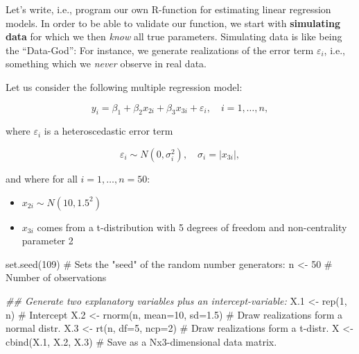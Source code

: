 \documentclass[
  letterpaper,
  DIV=11,
  numbers=noendperiod]{scrreprt}
\newenvironment{Shaded}{\begin{snugshade}}{\end{snugshade}}
\newcommand{\AttributeTok}[1]{\textcolor[rgb]{0.40,0.45,0.13}{#1}}
\newcommand{\CommentTok}[1]{\textcolor[rgb]{0.37,0.37,0.37}{#1}}
\newcommand{\DecValTok}[1]{\textcolor[rgb]{0.68,0.00,0.00}{#1}}
\newcommand{\DocumentationTok}[1]{\textcolor[rgb]{0.37,0.37,0.37}{\textit{#1}}}
\newcommand{\FloatTok}[1]{\textcolor[rgb]{0.68,0.00,0.00}{#1}}
\newcommand{\FunctionTok}[1]{\textcolor[rgb]{0.28,0.35,0.67}{#1}}
\newcommand{\NormalTok}[1]{\textcolor[rgb]{0.00,0.23,0.31}{#1}}
\newcommand{\OtherTok}[1]{\textcolor[rgb]{0.00,0.23,0.31}{#1}}
\providecommand{\tightlist}{%
  \setlength{\itemsep}{0pt}\setlength{\parskip}{0pt}}\usepackage{longtable,booktabs,array}
\theoremstyle{definition}
\theoremstyle{plain}
\theoremstyle{plain}
\theoremstyle{remark}
\begin{document}
Let's write, i.e., program our own R-function for estimating linear
regression models. In order to be able to validate our function, we
start with \textbf{simulating data} for which we then \emph{know} all
true parameters. Simulating data is like being the ``Data-God'': For
instance, we generate realizations of the error term \(\varepsilon_i\),
i.e., something which we \emph{never} observe in real data.

\hfill\break

Let us consider the following multiple regression model:

\[y_i=\beta_1 +\beta_2 x_{2i}+\beta_3 x_{3i}+\varepsilon_{i},\quad i=1,\dots,n,\]

where \(\varepsilon_{i}\) is a heteroscedastic error term

\[\varepsilon_{i}\sim N(0,\sigma_i^2),\quad \sigma_i=|x_{3i}|,\]

and where for all \(i=1,\dots,n=50\):

\begin{itemize}
\tightlist
\item
  \(x_{2i}\sim N(10,1.5^2)\)
\item
  \(x_{3i}\) comes from a t-distribution with 5 degrees of freedom and
  non-centrality parameter 2
\end{itemize}

\begin{Shaded}
\begin{Highlighting}[]
\FunctionTok{set.seed}\NormalTok{(}\DecValTok{109}\NormalTok{) }\CommentTok{\# Sets the "seed" of the random number generators:}
\NormalTok{n   }\OtherTok{\textless{}{-}} \DecValTok{50}     \CommentTok{\# Number of observations}

\DocumentationTok{\#\# Generate two explanatory variables plus an intercept{-}variable:}
\NormalTok{X}\FloatTok{.1} \OtherTok{\textless{}{-}} \FunctionTok{rep}\NormalTok{(}\DecValTok{1}\NormalTok{, n)                 }\CommentTok{\# Intercept}
\NormalTok{X}\FloatTok{.2} \OtherTok{\textless{}{-}} \FunctionTok{rnorm}\NormalTok{(n, }\AttributeTok{mean=}\DecValTok{10}\NormalTok{, }\AttributeTok{sd=}\FloatTok{1.5}\NormalTok{) }\CommentTok{\# Draw realizations form a normal distr.}
\NormalTok{X}\FloatTok{.3} \OtherTok{\textless{}{-}} \FunctionTok{rt}\NormalTok{(n, }\AttributeTok{df=}\DecValTok{5}\NormalTok{, }\AttributeTok{ncp=}\DecValTok{2}\NormalTok{)        }\CommentTok{\# Draw realizations form a t{-}distr.}
\NormalTok{X   }\OtherTok{\textless{}{-}} \FunctionTok{cbind}\NormalTok{(X}\FloatTok{.1}\NormalTok{, X}\FloatTok{.2}\NormalTok{, X}\FloatTok{.3}\NormalTok{)      }\CommentTok{\# Save as a Nx3{-}dimensional data matrix.}
\end{Highlighting}
\end{Shaded}
\end{document}
